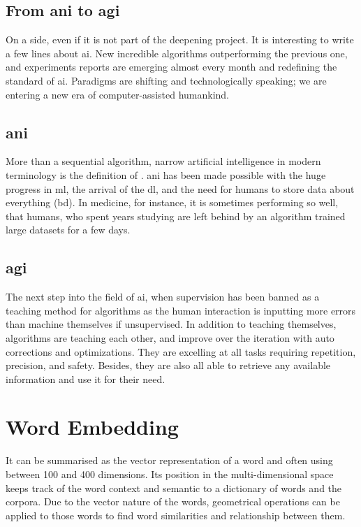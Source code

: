 \subsection{From \gls{ani} to \gls{agi}}
On a side, even if it is not part of the deepening project. It is interesting to write a few lines about \gls{ai}. New incredible algorithms outperforming the previous one, and experiments reports are emerging almost every month and redefining the standard of \gls{ai}. Paradigms are shifting and technologically speaking; we are entering a new era of computer-assisted humankind.

\subsection{\gls{ani}}
More than a sequential algorithm, narrow artificial intelligence in modern terminology is the definition of . \gls{ani} has been made possible with the huge progress in \gls{ml}, the arrival of the \gls{dl}, and the need for humans to store data about everything (\gls{bd}). In medicine, for instance, it is sometimes performing so well, that humans, who spent years studying are left behind by an algorithm trained large datasets for a few days.

\subsection{\gls{agi}}
The next step into the field of \gls{ai}, when supervision has been banned as a teaching method for algorithms as the human interaction is inputting more errors than machine themselves if unsupervised. In addition to teaching themselves, algorithms are teaching each other, and improve over the iteration with auto corrections and optimizations. They are excelling at all tasks requiring repetition, precision, and safety. Besides, they are also all able to retrieve any available information and use it for their need. 



\section{Word Embedding}
It can be summarised as the vector representation of a word and often using between 100 and 400 dimensions. Its position in the multi-dimensional space keeps track of the word context and semantic to a dictionary of words and the corpora. Due to the vector nature of the words, geometrical operations can be applied to those words to find word similarities and relationship between them. 



